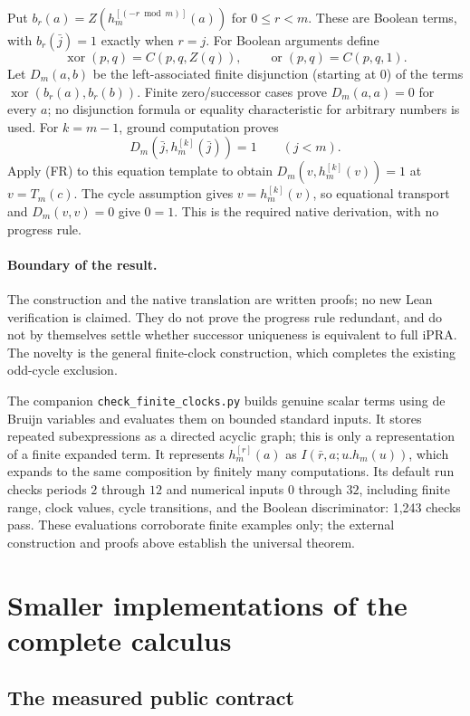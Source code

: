 \documentclass[11pt,letterpaper]{article}
\theoremstyle{definition}
\begin{document}
Put $b_r(a)=Z(h_m^{[(-r\bmod m)]}(a))$ for $0\leq r<m$.
These are Boolean terms, with $b_r(\bar j)=1$ exactly when $r=j$.
For Boolean arguments define
\[
 \operatorname{xor}(p,q)=C(p,q,Z(q)),\qquad
 \operatorname{or}(p,q)=C(p,q,1).
\]
Let $D_m(a,b)$ be the left-associated finite disjunction (starting at
$0$) of the terms $\operatorname{xor}(b_r(a),b_r(b))$.
Finite zero/successor cases prove $D_m(a,a)=0$ for every $a$; no
disjunction formula or equality characteristic for arbitrary numbers is
used. For $k=m-1$, ground computation proves
\[
 D_m(\bar j,h_m^{[k]}(\bar j))=1\qquad(j<m).
\]
Apply (FR) to this equation template to obtain
$D_m(v,h_m^{[k]}(v))=1$ at $v=T_m(c)$. The cycle assumption gives
$v=h_m^{[k]}(v)$, so equational transport and $D_m(v,v)=0$ give
$0=1$. This is the required native derivation, with no progress rule.

\paragraph{Boundary of the result.}
The construction and the native translation are written proofs; no new
Lean verification is claimed. They do not prove the progress rule
redundant, and do not by themselves settle whether successor uniqueness
is equivalent to full iPRA. The novelty is the general finite-clock
construction, which completes the existing odd-cycle exclusion.

The companion \texttt{check\_finite\_clocks.py} builds genuine scalar
terms using de Bruijn variables and evaluates them on bounded standard
inputs. It stores repeated subexpressions as a directed acyclic graph;
this is only a representation of a finite expanded term. It represents
$h_m^{[r]}(a)$ as $I(\bar r,a;u.h_m(u))$, which expands to the same
composition by finitely many computations. Its default run checks
periods $2$ through $12$ and numerical inputs $0$ through $32$, including
finite range, clock values, cycle transitions, and the Boolean
discriminator: 1,243 checks pass. These evaluations corroborate finite
examples only; the external construction and proofs above establish the
universal theorem.

\section{Smaller implementations of the complete calculus}
\label{sec:checkers}

\subsection{The measured public contract}
\end{document}
